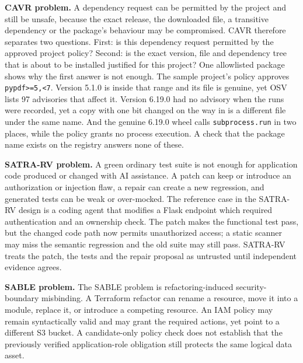\begin{sloppypar}
\textbf{CAVR problem.} A dependency request can be permitted by the project and still be unsafe, because the exact release, the downloaded file, a transitive dependency or the package's behaviour may be compromised. CAVR therefore separates two questions. First: is this dependency request permitted by the approved project policy? Second: is the exact version, file and dependency tree that is about to be installed justified for this project? One allowlisted package shows why the first answer is not enough. The sample project's policy approves \texttt{pypdf>=5,<7}. Version 5.1.0 is inside that range and its file is genuine, yet OSV lists 97 advisories that affect it. Version 6.19.0 had no advisory when the runs were recorded, yet a copy with one bit changed on the way in is a different file under the same name. And the genuine 6.19.0 wheel calls \texttt{subprocess.run} in two places, while the policy grants no process execution. A check that the package name exists on the registry answers none of these.
\end{sloppypar}

\begin{sloppypar}
\textbf{SATRA-RV problem.} A green ordinary test suite is not enough for application code produced or changed with AI assistance. A patch can keep or introduce an authorization or injection flaw, a repair can create a new regression, and generated tests can be weak or over-mocked. The reference case in the SATRA-RV design is a coding agent that modifies a Flask endpoint which required authentication and an ownership check. The patch makes the functional test pass, but the changed code path now permits unauthorized access; a static scanner may miss the semantic regression and the old suite may still pass. SATRA-RV treats the patch, the tests and the repair proposal as untrusted until independent evidence agrees.
\end{sloppypar}

\begin{sloppypar}
\textbf{SABLE problem.} The SABLE problem is refactoring-induced security-boundary misbinding. A Terraform refactor can rename a resource, move it into a module, replace it, or introduce a competing resource. An IAM policy may remain syntactically valid and may grant the required actions, yet point to a different S3 bucket. A candidate-only policy check does not establish that the previously verified application-role obligation still protects the same logical data asset.
\end{sloppypar}

